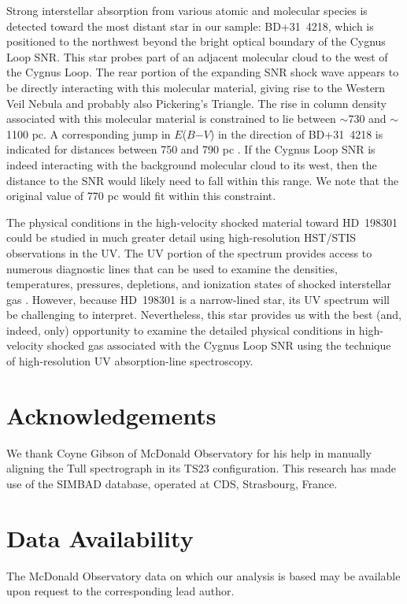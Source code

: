 \documentclass[fleqn,usenatbib]{mnras}
\begin{document}
Strong interstellar absorption from various atomic and molecular species is detected toward the most distant star in our sample: BD+31~4218, which is positioned to the northwest beyond the bright optical boundary of the Cygnus Loop SNR. This star probes part of an adjacent molecular cloud to the west of the Cygnus Loop. The rear portion of the expanding SNR shock wave appears to be directly interacting with this molecular material, giving rise to the Western Veil Nebula and probably also Pickering's Triangle. The rise in column density associated with this molecular material is constrained to lie between $\sim$730 and $\sim$1100 pc. A corresponding jump in $E$($B$$-$$V$) in the direction of BD+31~4218 is indicated for distances between 750 and 790 pc \citep{g19}. If the Cygnus Loop SNR is indeed interacting with the background molecular cloud to its west, then the distance to the SNR would likely need to fall within this range. We note that the original \citet{m58} value of 770 pc would fit within this constraint.

The physical conditions in the high-velocity shocked material toward HD~198301 could be studied in much greater detail using high-resolution HST/STIS observations in the UV. The UV portion of the spectrum provides access to numerous diagnostic lines that can be used to examine the densities, temperatures, pressures, depletions, and ionization states of shocked interstellar gas \citep[e.g.,][]{rjf20}. However, because HD~198301 is a narrow-lined star, its UV spectrum will be challenging to interpret. Nevertheless, this star provides us with the best (and, indeed, only) opportunity to examine the detailed physical conditions in high-velocity shocked gas associated with the Cygnus Loop SNR using the technique of high-resolution UV absorption-line spectroscopy.

\section*{Acknowledgements}
We thank Coyne Gibson of McDonald Observatory for his help in manually aligning the Tull spectrograph in its TS23 configuration. This research has made use of the SIMBAD database, operated at CDS, Strasbourg, France.

\section*{Data Availability}
The McDonald Observatory data on which our analysis is based may be available upon request to the corresponding lead author.
 
\end{document}

